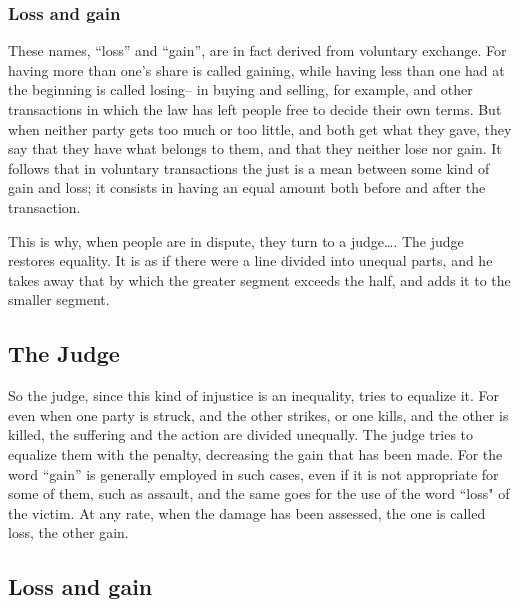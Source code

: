                     \subsubsection{Loss and gain}

                        These names, “loss” and “gain”, are in fact derived from voluntary exchange. For having more than one’s share is called gaining, while having less than one had at the beginning is called losing– in buying and selling, for example, and other transactions in which the law has left people free to decide their own terms. But when neither party gets too much or too little, and both get what they gave, they say that they have what belongs to them, and that they neither lose nor gain. It follows that in voluntary transactions the just is a mean between some kind of gain and loss; it consists in having an equal amount both before and after the transaction.

                        \begin{remark}
        
                            This is why, when people are in dispute, they turn to a judge…. The judge restores equality. It is as if there were a line divided into unequal parts, and he takes away that by which the greater segment exceeds the half, and adds it to the smaller segment.
                            
                        \end{remark}

            \subsection{The Judge}

                So the judge, since this kind of injustice is an inequality, tries to equalize it. For even when one party is struck, and the other strikes, or one kills, and the other is killed, the suffering and the action are divided unequally. The judge tries to equalize them with the penalty, decreasing the gain that has been made. For the word “gain” is generally employed in such cases, even if it is not appropriate for some of them, such as assault, and the same goes for the use of the word “loss" of the victim. At any rate, when the damage has been assessed, the one is called loss, the other gain.

            \subsection{Loss and gain}

